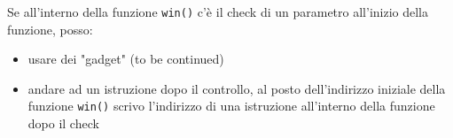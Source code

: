 
Se all'interno della funzione \texttt{win()} c'è il check di un parametro all'inizio della funzione, posso:
\begin{itemize}
	\item usare dei "gadget" (to be continued)
	\item andare ad un istruzione dopo il controllo, al posto dell'indirizzo iniziale della funzione \texttt{win()} scrivo l'indirizzo di una istruzione all'interno della funzione dopo il check
\end{itemize}


